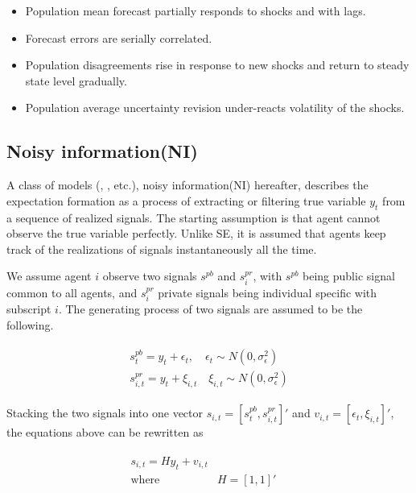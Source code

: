 \documentclass[]{article}
\begin{document}
	\begin{itemize}
		\item Population mean forecast partially responds to shocks and with lags. 
		\item Forecast errors are serially correlated. 
		\item Population disagreements rise in response to new shocks and return to steady state level gradually. 
		\item Population average uncertainty revision under-reacts volatility of the shocks.
	\end{itemize}
	
	\subsection{Noisy information(NI)}
	
	A class of models (\citet{lucas1972expectations}, \citet{sims2003implications}, \cite{woodford2001imperfect} etc.), noisy information(NI) hereafter, describes the expectation formation as a process of extracting or filtering true variable $y_t$ from a sequence of realized signals.  The starting assumption is that agent cannot observe the true variable perfectly. Unlike SE, it is assumed that agents keep track of the realizations of signals instantaneously all the time. 
	
	We assume agent $i$ observe two signals $s^{pb}$ and $s^{pr}_i$, with $s^{pb}$ being public signal common to all agents, and $s^{pr}_i$ private signals being individual specific with subscript $i$. The generating process of two signals are assumed to be the following.
	
	\begin{eqnarray}\label{NISigDef}
		\begin{aligned}
			s^{pb}_t = y_t + \epsilon_t, \quad \epsilon_t \sim N(0,\sigma^2_\epsilon)\\ 
			s^{pr}_{i,t} = y_t + \xi_{i,t} \quad \xi_{i,t} \sim N(0,\sigma^2_\epsilon)
		\end{aligned}
	\end{eqnarray}
	
	Stacking the two signals into one vector $s_{i,t} = [s^{pb}_t,s^{pr}_{i,t}]'$ and $v_{i,t}= [\epsilon_t,\xi_{i,t}]'$, the equations above can be rewritten as 
	
	\begin{eqnarray}
		\begin{aligned}
			s_{i,t} = H y_{t} + v_{i,t} \\
			\text{where } & H=[1,1]' \quad \\
		\end{aligned}
	\end{eqnarray}
	
\end{document}
